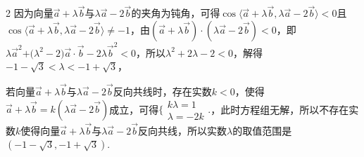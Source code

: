 \begin{multicols}{2}
\bindp 因为向量\(\overrightarrow{a} + \lambda\overrightarrow{b}\)与\(\lambda\overrightarrow{a} - 2\overrightarrow{b}\)的夹角为钝角，可得\(\cos\langle \overrightarrow{a} + \lambda\overrightarrow{b},\lambda\overrightarrow{a} - 2\overrightarrow{b} \rangle < 0\)且\(\cos\langle \overrightarrow{a} + \lambda\overrightarrow{b},\lambda\overrightarrow{a} - 2\overrightarrow{b} \rangle \neq - 1\)，由\(( \overrightarrow{a} + \lambda\overrightarrow{b} ) \cdot ( \lambda\overrightarrow{a} - 2\overrightarrow{b} ) < 0\)，即\(\lambda{\overrightarrow{a}}^{2}\text{+(}\lambda^{2} - 2)\overrightarrow{a} \cdot \overrightarrow{b} - 2\lambda{\overrightarrow{b}}^{2} < 0\)，所以\(\lambda^{2} + 2\lambda - 2 < 0\)，解得\(- 1 - \sqrt{3} < \lambda < - 1 + \sqrt{3}\)，

\bindp 若向量\(\overrightarrow{a} + \lambda\overrightarrow{b}\)与\(\lambda\overrightarrow{a} - 2\overrightarrow{b}\)反向共线时，存在实数\(k < 0\)，使得\(\overrightarrow{a} + \lambda\overrightarrow{b} = k(\lambda\overrightarrow{a} - 2\overrightarrow{b})\)成立，可得\(\Bigg\{ \begin{array}{r}
k\lambda = 1 \\
\lambda = - 2k
\end{array} \Bigg.\)，此时方程组无解，所以不存在实数\(k\)使得向量\(\overrightarrow{a} + \lambda\overrightarrow{b}\)与\(\lambda\overrightarrow{a} - 2\overrightarrow{b}\)反向共线，所以实数\(\lambda\)的取值范围是\(( - 1 - \sqrt{3}, - 1 + \sqrt{3} )\).







\end{multicols}
